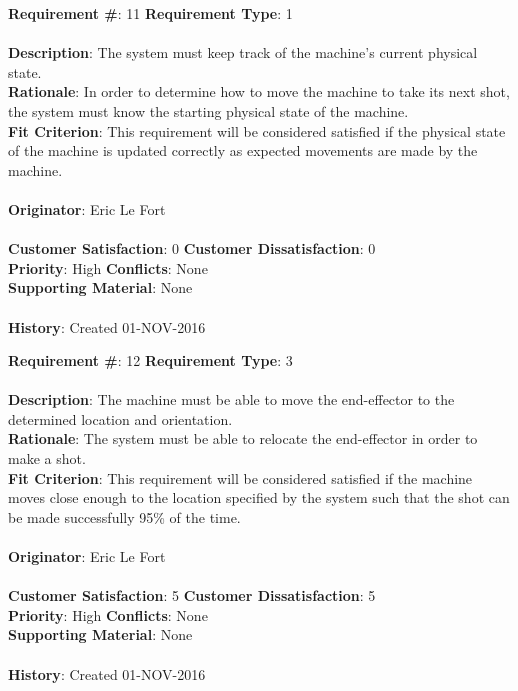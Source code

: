\documentclass[titlepage]{article}
\begin{document}
\begin{framed}
	\noindent\textbf{Requirement \#}: 11 \hfill \textbf{Requirement Type}: 1 \hfill\\\\
	\noindent\textbf{Description}: The system must keep track of the machine's current physical state.\\
	\textbf{Rationale}: In order to determine how to move the machine to take its next shot, the system must know the starting physical state of the machine.\\
	\textbf{Fit Criterion}: This requirement will be considered satisfied if the physical state of the machine is updated correctly as expected movements are made by the machine.\\\\
	\textbf{Originator}: Eric Le Fort\\\\
	\noindent\textbf{Customer Satisfaction}: 0 \hfill 	\textbf{Customer Dissatisfaction}: 0 \hfill\\
	\textbf{Priority}: High \hfill \textbf{Conflicts}: None \hfill\\
	\textbf{Supporting Material}: None\\\\
	\noindent\textbf{History}: Created 01-NOV-2016
\end{framed}

\begin{framed}
	\noindent\textbf{Requirement \#}: 12 \hfill \textbf{Requirement Type}: 3 \hfill\\\\
	\noindent\textbf{Description}: The machine must be able to move the end-effector to the determined location and orientation.\\
	\textbf{Rationale}: The system must be able to relocate the end-effector in order to make a shot.\\
	\textbf{Fit Criterion}: This requirement will be considered satisfied if the machine moves close enough to the location specified by the system such that the shot can be made successfully 95\% of the time.\\\\
	\textbf{Originator}: Eric Le Fort\\\\
	\noindent\textbf{Customer Satisfaction}: 5 \hfill 	\textbf{Customer Dissatisfaction}: 5 \hfill\\
	\textbf{Priority}: High \hfill \textbf{Conflicts}: None \hfill\\
	\textbf{Supporting Material}: None\\\\
	\noindent\textbf{History}: Created 01-NOV-2016
\end{framed}
\end{document}
